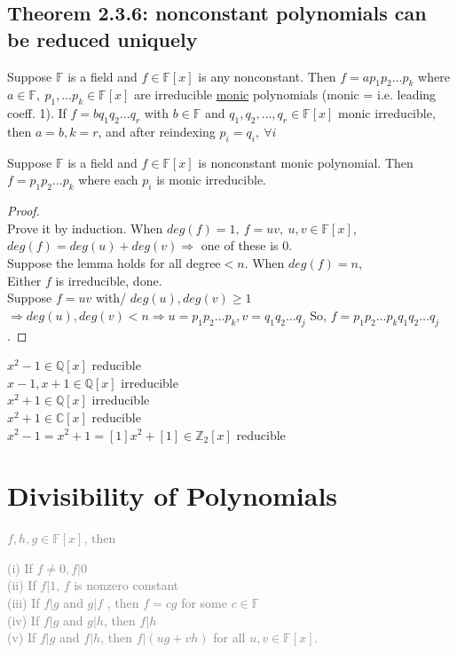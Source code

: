 \documentclass[11pt]{elegantbook}
\begin{document}
{\section{Theorem 2.3.6: nonconstant polynomials can be reduced uniquely}
\begin{theorem}[Theorem 2.3.6]
Suppose $\mathbb{F}$ is a field and $f\in\mathbb{F}[x]$ is any nonconstant. Then $f = ap_1p_2\dots p_k$ where $a \in \mathbb{F},\ p_1,\dots p_k \in \mathbb{F}[x]$ are irreducible \underline{monic} polynomials (monic = i.e. leading coeff. 1). If $f = bq_1q_2\dots q_r$ with $b \in \mathbb{F}$ and
$q_1,q_2,\dots ,q_r \in \mathbb{F}[x]$ monic irreducible, then $a = b, k = r$, and after reindexing $p_i = q_i,\ \forall i$
\end{theorem}
\begin{lemma}[Lemma 2.3.7]
    Suppose $\mathbb{F}$ is a field and $f\in\mathbb{F}[x]$ is nonconstant monic polynomial. Then $f = p_1p_2\dots p_k$ where each $p_i$ is monic irreducible.
\end{lemma}
\begin{proof}
\quad\\
Prove it by induction. When $deg(f)=1,\ f=uv,\ u,v\in\mathbb{F}[x]$, $deg(f)=deg(u)+deg(v)\Rightarrow$ one of these is 0.\\
Suppose the lemma holds for all degree$<n$. When $deg(f)=n$,\\
Either $f$ is irreducible, done.\\
Suppose $f = uv$ with/ $deg(u), deg(v)\geq 1$\\
$\Rightarrow deg(u),deg(v)<n\Rightarrow u=p_1p_2\dots p_k, v=q_1q_2\dots q_j$
So, $f = p_1p_2\dots p_kq_1q_2\dots q_j$.
\end{proof}
\begin{example}
$x^2-1\in\mathbb{Q}[x]$ reducible\\
$x-1,x+1\in\mathbb{Q}[x]$ irreducible\\
$x^2+1\in\mathbb{Q}[x]$ irreducible\\
$x^2+1\in\mathbb{C}[x]$ reducible\\
$x^2-1=x^2+1=[1]x^2+[1]\in\mathbb{Z}_2[x]$ reducible\\
\end{example}}

\chapter{Divisibility of Polynomials}
\textcolor{gray}{
\begin{proposition}[Proposition 2.3.8]
    $f , h, g \in \mathbb{F}[x]$, then
\end{proposition}
(i) If $f \neq 0, f |0$\\
(ii) If $f |1$, $f$ is nonzero constant\\
(iii) If $f |g$ and $g|f$ , then $f = cg$ for some $c \in \mathbb{F}$\\
(iv) If $f |g$ and $g|h$, then $f |h$\\
(v) If $f|g$ and $f|h$, then $f|(ug + vh)$ for all $u, v \in \mathbb{F}[x]$.}
\end{document}
